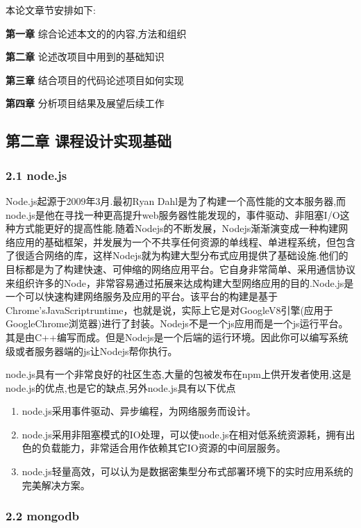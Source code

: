 \documentclass[]{article}
\begin{document}
本论文章节安排如下:

\textbf{第一章} 综合论述本文的的内容,方法和组织

\textbf{第二章} 论述改项目中用到的基础知识

\textbf{第三章} 结合项目的代码论述项目如何实现

\textbf{第四章} 分析项目结果及展望后续工作

\hypertarget{header-n104}{%
\subsection{第二章 课程设计实现基础}\label{header-n104}}

\hypertarget{header-n105}{%
\subsubsection{2.1 node.js}\label{header-n105}}

Node.js起源于2009年3月.最初Ryan
Dahl是为了构建一个高性能的文本服务器,而node.js是他在寻找一种更高提升web服务器性能发现的，事件驱动、非阻塞I/O这种方式能更好的提高性能.随着Nodejs的不断发展，Nodejs渐渐演变成一种构建网络应用的基础框架，并发展为一个不共享任何资源的单线程、单进程系统，但包含了很适合网络的库，这样Nodejs就为构建大型分布式应用提供了基础设施.他们的目标都是为了构建快速、可伸缩的网络应用平台。它自身非常简单、采用通信协议来组织许多的Node，非常容易通过拓展来达成构建大型网络应用的目的.Node.js是一个可以快速构建网络服务及应用的平台。该平台的构建是基于Chrome'sJavaScriptruntime，也就是说，实际上它是对GoogleV8引擎(应用于GoogleChrome浏览器)进行了封装。Nodejs不是一个js应用而是一个js运行平台。其是由C++编写而成。但是Nodejs是一个后端的运行环境。因此你可以编写系统级或者服务器端的js让Nodejs帮你执行。

node.js具有一个非常良好的社区生态,大量的包被发布在npm上供开发者使用,这是node.js的优点,也是它的缺点,另外node.js具有以下优点

\begin{enumerate}
\def\labelenumi{\arabic{enumi}.}
\item
  node.js采用事件驱动、异步编程，为网络服务而设计。
\item
  node.js采用非阻塞模式的IO处理，可以使node.js在相对低系统资源耗，拥有出色的负载能力，非常适合用作依赖其它IO资源的中间层服务。
\item
  node.js轻量高效，可以认为是数据密集型分布式部署环境下的实时应用系统的完美解决方案。
\end{enumerate}

\hypertarget{header-n120}{%
\subsubsection{2.2 mongodb}\label{header-n120}}
\end{document}
